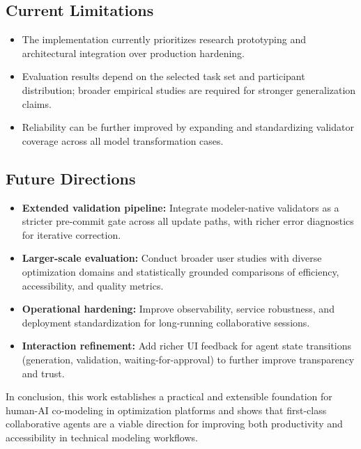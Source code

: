 \subsection{Current Limitations}
\begin{itemize}
    \item The implementation currently prioritizes research prototyping and architectural integration over production hardening.
    \item Evaluation results depend on the selected task set and participant distribution; broader empirical studies are required for stronger generalization claims.
    \item Reliability can be further improved by expanding and standardizing validator coverage across all model transformation cases.
\end{itemize}

\subsection{Future Directions}
\begin{itemize}
    \item \textbf{Extended validation pipeline:} Integrate modeler-native validators as a stricter pre-commit gate across all update paths, with richer error diagnostics for iterative correction.
    \item \textbf{Larger-scale evaluation:} Conduct broader user studies with diverse optimization domains and statistically grounded comparisons of efficiency, accessibility, and quality metrics.
    \item \textbf{Operational hardening:} Improve observability, service robustness, and deployment standardization for long-running collaborative sessions.
    \item \textbf{Interaction refinement:} Add richer UI feedback for agent state transitions (generation, validation, waiting-for-approval) to further improve transparency and trust.
\end{itemize}

In conclusion, this work establishes a practical and extensible foundation for human-AI co-modeling in optimization platforms and shows that first-class collaborative agents are a viable direction for improving both productivity and accessibility in technical modeling workflows.

